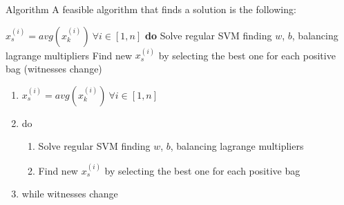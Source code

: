 \begin{frame}{Algorithm}
	A feasible algorithm that finds a solution is the following:
	
	\begin{codebox}
		\li $x_s^{(i)} = avg(x_k^{(i)}) \ \forall i \in [1, n]$
		\li \textbf{do} \Do
		\li Solve regular SVM finding $w$, $b$, balancing lagrange multipliers
		\li Find new $x_s^{(i)}$ by selecting the best one for each positive bag \End
		\li \While(witnesses change)
		
	\end{codebox}
	
	\begin{enumerate}
		\item $x_s^{(i)} = avg(x_k^{(i)}) \ \forall i \in [1, n]$
		\item do
		\begin{enumerate}
			\item Solve regular SVM finding $w$, $b$, balancing lagrange multipliers
			\item Find new $x_s^{(i)}$ by selecting the best one for each positive bag
		\end{enumerate}
		\item while witnesses change
	\end{enumerate}
\end{frame}

